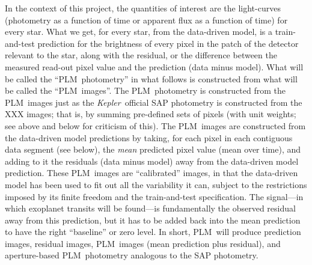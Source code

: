 \documentclass[12pt, preprint]{aastex}
\newcommand{\project}[1]{\textsl{#1}}
\newcommand{\Kepler}{\project{Kepler}}
\newcommand{\name}{PLM}
\begin{document}
In the context of this project, the quantities of interest are the light-curves
  (photometry as a function of time or apparent flux as a function of time)
  for every star.
What we get, for every star, from the data-driven model, is a train-and-test prediction
  for the brightness of every pixel in the patch of the detector relevant to the star,
  along with the residual, or the difference between the measured read-out pixel value and the prediction (data minus model).
What will be called the ``\name\ photometry'' in what follows is constructed from what will be called the ``\name\ images''.
The \name\ photometry is constructed from the \name\ images just as the \Kepler\ official SAP photometry is constructed from the XXX images;
  that is, by summing pre-defined sets of pixels (with unit weights; see above and below for criticism of this).
The \name\ images are constructed from the data-driven model predictions by taking,
  for each pixel in each contiguous data segment (see below),
  the \emph{mean} predicted pixel value (mean over time),
  and adding to it the residuals (data minus model) away from the data-driven model prediction.
These \name\ images are ``calibrated'' images,
  in that the data-driven model has been used to fit out all the variability it can,
  subject to the restrictions imposed by its finite freedom and the train-and-test specification.
The signal---in which exoplanet transits will be found---is fundamentally the observed residual away from this prediction,
  but it has to be added back into the mean prediction to have the right ``baseline'' or zero level.
In short, \name\ will produce prediction images, residual images, \name\ images (mean prediction plus residual),
  and aperture-based \name\ photometry analogous to the SAP photometry.
\end{document}
